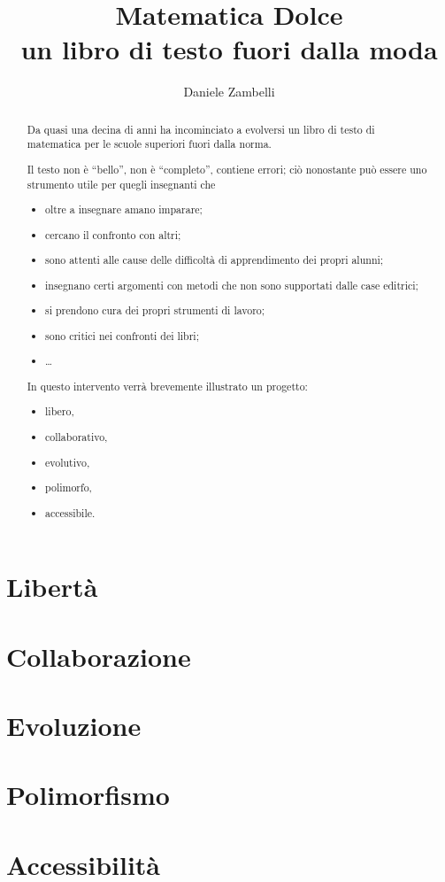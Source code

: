 \documentclass[a4paper,10pt]{article}
\title{Matematica Dolce\\ 
un libro di testo fuori dalla moda}
\author{Daniele Zambelli}
\begin{document}
\maketitle

\begin{abstract}
Da quasi una decina di anni ha incominciato a evolversi un libro di testo di 
matematica per le scuole superiori fuori dalla norma.

Il testo non è ``bello'', non è ``completo'', contiene errori;
ciò nonostante può essere uno strumento utile per quegli insegnanti che
\begin{itemize}
\item oltre a insegnare amano imparare;
\item cercano il confronto con altri;
\item sono attenti alle cause delle difficoltà di apprendimento dei propri 
alunni;
\item insegnano certi argomenti con metodi che non sono supportati dalle case 
editrici;
\item si prendono cura dei propri strumenti di lavoro;
\item sono critici nei confronti dei libri;
\item \dots
\end{itemize}

In questo intervento verrà brevemente illustrato un progetto:
\begin{itemize}
\item libero,
\item collaborativo,
\item evolutivo,
\item polimorfo,
\item accessibile.
\end{itemize}

\end{abstract}

\section{Libertà}

\section{Collaborazione}

\section{Evoluzione}

\section{Polimorfismo}

\section{Accessibilità}
\end{document}
